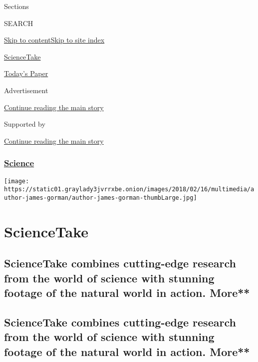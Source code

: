Sections

SEARCH

\protect\hyperlink{site-content}{Skip to
content}\protect\hyperlink{site-index}{Skip to site index}

\href{https://www.nytimes3xbfgragh.onion/column/sciencetake}{ScienceTake}

\href{https://myaccount.nytimes3xbfgragh.onion/auth/login?response_type=cookie\&client_id=vi}{}

\href{https://www.nytimes3xbfgragh.onion/section/todayspaper}{Today's
Paper}

Advertisement

\protect\hyperlink{after-top}{Continue reading the main story}

Supported by

\protect\hyperlink{after-sponsor}{Continue reading the main story}

\hypertarget{science}{%
\subsubsection{\texorpdfstring{\href{/section/science}{Science}}{Science}}\label{science}}

\texttt{[image: https://static01.graylady3jvrrxbe.onion/images/2018/02/16/multimedia/author-james-gorman/author-james-gorman-thumbLarge.jpg]}

\hypertarget{sciencetake}{%
\section{ScienceTake}\label{sciencetake}}

\hypertarget{sciencetake-combines-cutting-edge-research-from-the-world-of-science-with-stunning-footage-of-the-natural-world-in-action-more}{%
\subsection{ScienceTake combines cutting-edge research from the world of
science with stunning footage of the natural world in action.
More**}\label{sciencetake-combines-cutting-edge-research-from-the-world-of-science-with-stunning-footage-of-the-natural-world-in-action-more}}

\hypertarget{sciencetake-combines-cutting-edge-research-from-the-world-of-science-with-stunning-footage-of-the-natural-world-in-action-more-1}{%
\subsection{ScienceTake combines cutting-edge research from the world of
science with stunning footage of the natural world in action.
More**}\label{sciencetake-combines-cutting-edge-research-from-the-world-of-science-with-stunning-footage-of-the-natural-world-in-action-more-1}}

